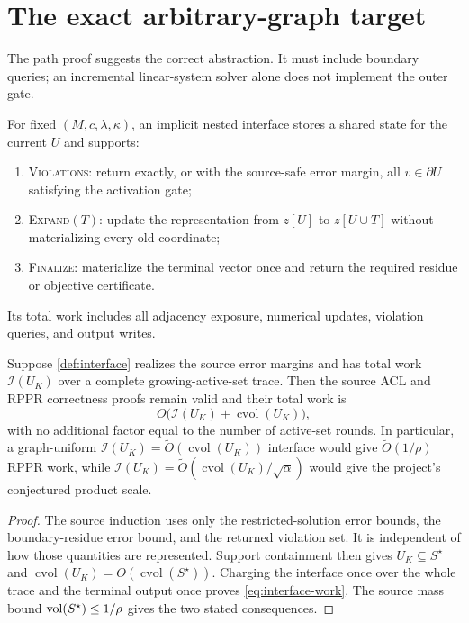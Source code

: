 \documentclass[11pt]{article}
\begin{document}
\section{The exact arbitrary-graph target}
\label{sec:interface}

The path proof suggests the correct abstraction.  It must include boundary
queries; an incremental linear-system solver alone does not implement the
outer gate.

\begin{definition}
\label{def:interface}
For fixed $(M,c,\lambda,\kappa)$, an implicit nested interface stores a shared
state for the current $U$ and supports:
\begin{enumerate}[label=(\roman*)]
\item \textsc{Violations}: return exactly, or with the source-safe error
margin, all $v\in\partial U$ satisfying the activation gate;
\item \textsc{Expand}$(T)$: update the representation from $z[U]$ to
$z[U\cup T]$ without materializing every old coordinate;
\item \textsc{Finalize}: materialize the terminal vector once and return the
required residue or objective certificate.
\end{enumerate}
Its total work includes all adjacency exposure, numerical updates, violation
queries, and output writes.
\end{definition}

\begin{theorem}
\label{thm:conditional-interface}
Suppose \cref{def:interface} realizes the source error margins and has total
work $\mathcal I(U_K)$ over a complete growing-active-set trace.  Then the
source ACL and RPPR correctness proofs remain valid and their total work is
\begin{equation}
 O\bigl(\mathcal I(U_K)+\operatorname{cvol}(U_K)\bigr),
 \label{eq:interface-work}
\end{equation}
with no additional factor equal to the number of active-set rounds.  In
particular, a graph-uniform
$\mathcal I(U_K)=\widetilde O(\operatorname{cvol}(U_K))$ interface would give
$\widetilde O(1/\rho)$ RPPR work, while
$\mathcal I(U_K)=\widetilde O(\operatorname{cvol}(U_K)/\sqrt\alpha)$ would
give the project's conjectured product scale.
\end{theorem}

\begin{proof}
The source induction uses only the restricted-solution error bounds, the
boundary-residue error bound, and the returned violation set.  It is
independent of how those quantities are represented.  Support containment
then gives $U_K\subseteq S^\star$ and
$\operatorname{cvol}(U_K)=O(\operatorname{cvol}(S^\star))$.  Charging the
interface once over the whole trace and the terminal output once proves
\cref{eq:interface-work}.  The source mass bound
$\operatorname{vol}(S^\star)\leq1/\rho$ gives the two stated consequences.
\end{proof}
\end{document}
